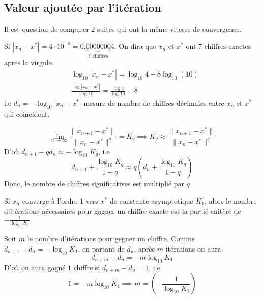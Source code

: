 \subsection{Valeur ajoutée par l'itération}
Il est question de comparer $2$ suites qui ont la même vitesse de convergence.
\begin{remark}
    Si $|x_n - x^*| = 4 \cdot 10^{-8} = 0.\underbrace{0000000}_{7 \text{ chiffres}}4$. On dira que $x_n$ et  $x^*$ ont 7 chiffres exactes apres la virgule.
    \begin{align*}
    &\log_{10} |x_n - x^*| = \log_{10}4 - 8\log_{10}(10)\\
    &\frac{\log|x_n - x^*|}{\log 10} = \frac{\log 4}{\log 10} - 8
    \end{align*}
    i.e $d_n = - \log_{10} |x_n - x^*|$ mesure de nombre de chiffres décimales entre $x_n$ et  $x^*$ qui coincident.
\end{remark}
\begin{remark}
   \[
       \lim_{n \to \infty} \frac{\|x_{n+1} - x^*\|}{\|x_n - x^*\|^q} = K_q \implies K_q \approx \frac{\|x_{n+1} - x^*\|}{\|x_n - x^*\|^q}
   \]  
   D'où $d_{n+1} - q d_n \approx -\log_{10} K_q$, i.e
   \[
   d_{n+1} + \frac{\log_{10} K_q}{1 - q} \approx q(d_n + \frac{\log_{10} K_q}{1 - q})
   \] 
   Donc, le nombre de chiffres significatives est multiplié par $q$.
\end{remark}
\begin{prop}
   Si $x_n$ converge à l'ordre  $1$ vers  $x^*$ de constante asymptotique  $K_1$, alors le nombre d'itérations nécessaires pour gagner un chiffre exacte est la partié enitère de  $-\frac{1}{\log_{10}K_1}$ 
\end{prop}
\begin{preuve}
Soit $m$ le nombre d'itérations pour gegner un chiffre. Comme  $d_{n+1} - d_n = -\log_{10} K_1$, en partant de $d_n$, après  $m$ itérations on aura
 \[
     d_{n+m} - d_{n} = -m \log_{10}K_1
\] 
D'où on aura gagné $1$ chiffre si  $d_{n+m} - d_n = 1$, i.e
\[
1 = -m \log_{10}K_1 \implies m = \left( -\frac{1}{\log_{10}K_1} \right) 
\] 
\end{preuve}

